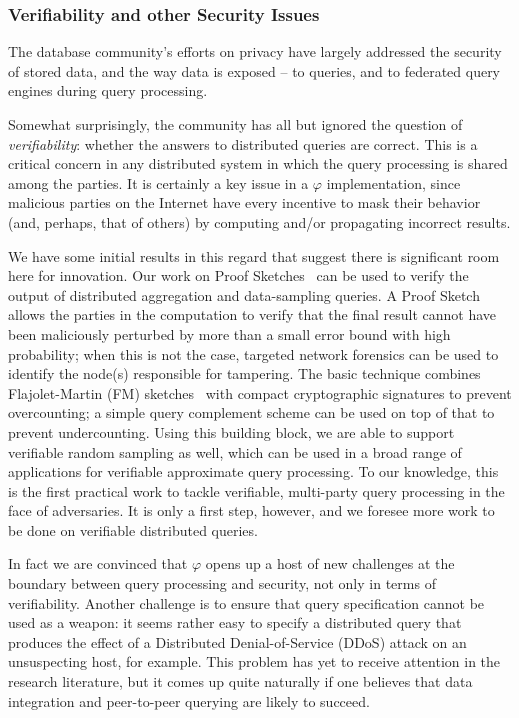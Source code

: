 \documentclass{acm_proc_article-sp}
\def\philogo{{\large $\varphi$}\xspace}
\begin{document}
\subsubsection{Verifiability and other Security Issues} The database community's efforts on privacy have largely addressed the security of stored data, and the way data is exposed -- to queries, and to federated query engines during query processing.

Somewhat surprisingly, the community has all but ignored the question of {\em verifiability}: whether the answers to distributed queries are correct. This is a critical concern in any distributed system in which the query processing is shared among the parties. It is certainly a key issue in a \philogo implementation, since malicious parties on the Internet have every incentive to mask their behavior (and, perhaps, that of others) by computing and/or propagating incorrect results. 

We have some initial results in this regard that suggest there is significant room here for innovation. Our work on Proof Sketches~\cite{proofsketch} can be used to verify the output of distributed aggregation and data-sampling queries. A Proof Sketch allows the parties in the computation to verify that the final result cannot have been maliciously perturbed by more than a small error bound with high probability; when this is not the case, targeted network forensics can be used to identify the node(s) responsible for tampering. The basic technique combines Flajolet-Martin (FM) sketches~\cite{flajolet} with compact cryptographic signatures to prevent overcounting; a simple query complement scheme can be used on top of that to prevent undercounting. Using this building block, we are able to support verifiable random sampling as well, which can be used in a broad range of applications for verifiable approximate query processing. To our knowledge, this is the first practical work to tackle verifiable, multi-party query processing in the face of adversaries. It is only a first step, however, and we foresee more work to be done on verifiable distributed queries.

In fact we are convinced that \philogo opens up a host of new
challenges at the boundary between query processing and security, not
only in terms of verifiability. Another challenge is to ensure that
query specification cannot be used as a weapon: it seems rather easy
to specify a distributed query that produces the effect of a
Distributed Denial-of-Service (DDoS) attack on an unsuspecting host,
for example. This problem has yet to receive attention in the research
literature, but it comes up quite naturally if one believes that data
integration and peer-to-peer querying are likely to succeed.
\end{document}
